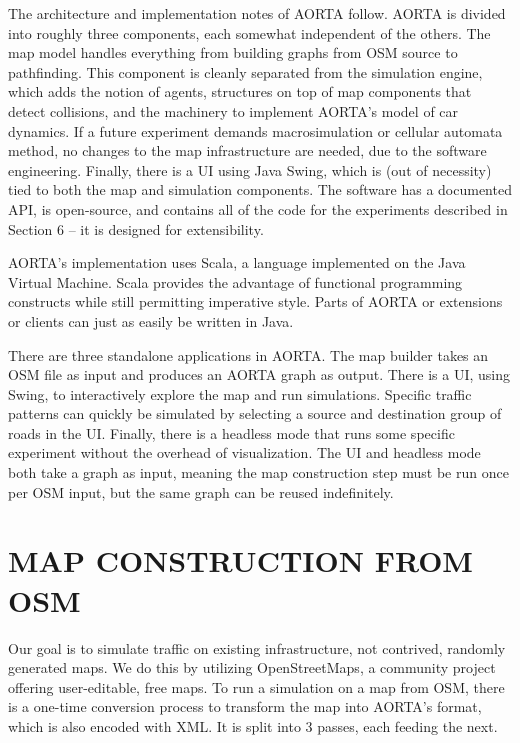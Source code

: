 \documentclass[letterpaper, 10 pt, conference]{ieeeconf}  %
\begin{document}
{ 
  \begin{center}
    \setlength\fboxsep{0pt}
    \setlength\fboxrule{0.5pt}
  \end{center}
}

The architecture and implementation notes of AORTA follow. AORTA is divided into
roughly three components, each somewhat independent of the others. The map model
handles everything from building graphs from OSM source to pathfinding. This
component is cleanly separated from the simulation engine, which adds the notion
of agents, structures on top of map components that detect collisions, and the
machinery to implement AORTA's model of car dynamics. If a future experiment
demands macrosimulation or cellular automata method, no changes to the map
infrastructure are needed, due to the software engineering. Finally, there is a
UI using Java Swing, which is (out of necessity) tied to both the map and
simulation components. The software has a documented API, is open-source, and
contains all of the code for the experiments described in Section 6 -- it is
designed for extensibility.

AORTA's implementation uses Scala, a language implemented on the Java Virtual
Machine. Scala provides the advantage of functional programming constructs while
still permitting imperative style. Parts of AORTA or extensions or clients can
just as easily be written in Java.

There are three standalone applications in AORTA. The map builder takes an OSM
file as input and produces an AORTA graph as output. There is a UI, using Swing,
to interactively explore the map and run simulations. Specific traffic patterns
can quickly be simulated by selecting a source and destination group of roads in
the UI. Finally, there is a headless mode that runs some specific experiment
without the overhead of visualization. The UI and headless mode both take a
graph as input, meaning the map construction step must be run once per OSM
input, but the same graph can be reused indefinitely.


\section{MAP CONSTRUCTION FROM OSM}

Our goal is to simulate traffic on existing infrastructure, not contrived,
randomly generated maps. We do this by utilizing OpenStreetMaps, a community
project offering user-editable, free maps.  To run a simulation on a map from
OSM, there is a one-time conversion process to transform the map into AORTA's
format, which is also encoded with XML. It is split into 3 passes, each feeding
the next.
\end{document}
